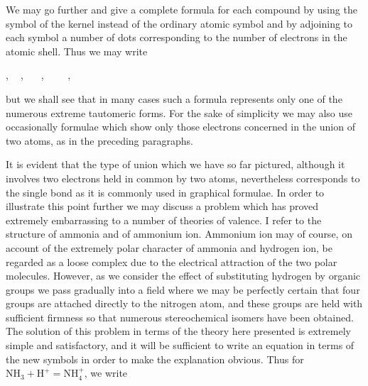 \documentclass[11pt]{memoir}
\begin{document}
We may go further and give a complete formula for each compound by using the symbol of the kernel instead of the ordinary atomic symbol and by adjoining to each symbol a number of dots corresponding to the number of electrons in the atomic shell.  Thus we may write 

\renewcommand*\printatom[1]{\ensuremath{\mathbf{#1}}}






\bigskip

\begin{center}
, $\;\;$
, $\;\;$
$\;\;$, $\;\;$
 $\;$
$\;\;$, $\;\;$
\end{center}

\bigskip

\noindent but we shall see that in many cases such a formula represents only one of the numerous extreme tautomeric forms.  For the sake of simplicity we may also use occasionally formulae which show only those electrons concerned in the union of two atoms, as in the preceding paragraphs.

It is evident that the type of union which we have so far pictured, although it involves two electrons held in common by two atoms, nevertheless corresponds to the single bond as it is commonly used in graphical formulae.  In order to illustrate this point further we may discuss a problem which has proved extremely embarrassing to a number of theories of valence.  I refer to the structure of ammonia and of ammonium ion.  Ammonium ion may of course, on account of the extremely polar character of ammonia and hydrogen ion, be regarded as a loose complex due to the electrical attraction of the two polar molecules.  However, as we consider the effect of substituting hydrogen by organic groups we pass gradually into a field where we may be perfectly certain that four groups are attached directly to the nitrogen atom, and these groups are held with sufficient firmness so that numerous stereochemical isomers have been obtained.  The solution of this problem in terms of the theory here presented is extremely simple and satisfactory, and it will be sufficient to write an equation in terms of the new symbols in order to make the explanation obvious.  Thus for $\mathrm{NH_3} + \mathrm{H^+} = \mathrm{NH_4^+}$, we write %
\end{document}
